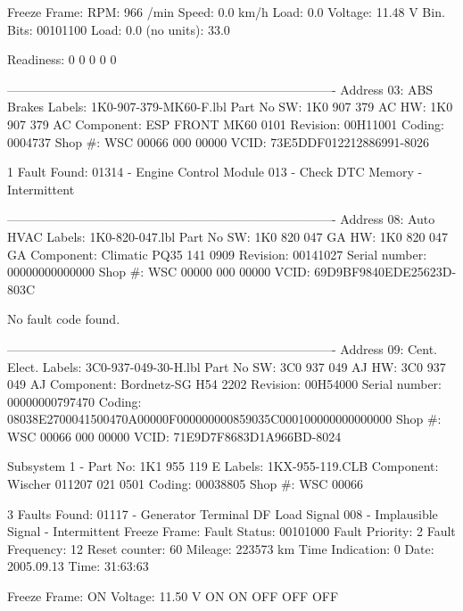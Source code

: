              Freeze Frame:
                    RPM: 966 /min
                    Speed: 0.0 km/h
                    Load: 0.0 %
                    Voltage: 11.48 V
                    Bin. Bits: 00101100
                    Load: 0.0 %
                    (no units): 33.0

Readiness: 0 0 0 0 0 

-------------------------------------------------------------------------------
Address 03: ABS Brakes        Labels: 1K0-907-379-MK60-F.lbl
   Part No SW: 1K0 907 379 AC    HW: 1K0 907 379 AC
   Component: ESP FRONT MK60      0101  
   Revision: 00H11001    
   Coding: 0004737
   Shop #: WSC 00066 000 00000
   VCID: 73E5DDF012212886991-8026

1 Fault Found:
01314 - Engine Control Module 
            013 - Check DTC Memory - Intermittent

-------------------------------------------------------------------------------
Address 08: Auto HVAC        Labels: 1K0-820-047.lbl
   Part No SW: 1K0 820 047 GA    HW: 1K0 820 047 GA
   Component: Climatic PQ35   141 0909  
   Revision: 00141027    Serial number: 00000000000000
   Shop #: WSC 00000 000 00000
   VCID: 69D9BF9840EDE25623D-803C

No fault code found.

-------------------------------------------------------------------------------
Address 09: Cent. Elect.        Labels: 3C0-937-049-30-H.lbl
   Part No SW: 3C0 937 049 AJ    HW: 3C0 937 049 AJ
   Component: Bordnetz-SG     H54 2202  
   Revision: 00H54000    Serial number: 00000000797470
   Coding: 08038E2700041500470A00000F000000000859035C000100000000000000
   Shop #: WSC 00066 000 00000
   VCID: 71E9D7F8683D1A966BD-8024

   Subsystem 1 - Part No: 1K1 955 119 E  Labels: 1KX-955-119.CLB
   Component: Wischer 011207 021  0501  
   Coding: 00038805
   Shop #: WSC 00066  

3 Faults Found:
01117 - Generator Terminal DF Load Signal 
            008 - Implausible Signal - Intermittent
             Freeze Frame:
                    Fault Status: 00101000
                    Fault Priority: 2
                    Fault Frequency: 12
                    Reset counter: 60
                    Mileage: 223573 km
                    Time Indication: 0
                    Date: 2005.09.13
                    Time: 31:63:63

             Freeze Frame:
                        ON
                    Voltage: 11.50 V
                        ON
                        ON
                        OFF
                        OFF
                        OFF

